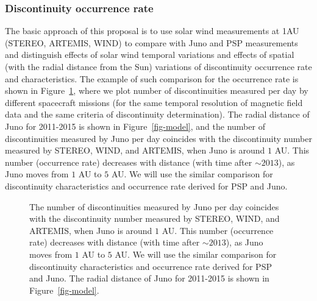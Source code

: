 \documentclass[
  letterpaper,
  DIV=11,
  numbers=noendperiod]{scrartcl}
\begin{document}
\subsubsection{Discontinuity occurrence
rate}\label{discontinuity-occurrence-rate}

The basic approach of this proposal is to use solar wind measurements at
1AU (STEREO, ARTEMIS, WIND) to compare with Juno and PSP measurements
and distinguish effects of solar wind temporal variations and effects of
spatial (with the radial distance from the Sun) variations of
discontinuity occurrence rate and characteristics. The example of such
comparison for the occurrence rate is shown in Figure~\ref{fig-rate},
where we plot number of discontinuities measured per day by different
spacecraft missions (for the same temporal resolution of magnetic field
data and the same criteria of discontinuity determination). The radial
distance of Juno for 2011-2015 is shown in Figure~\ref{fig-model}, and
the number of discontinuities measured by Juno per day coincides with
the discontinuity number measured by STEREO, WIND, and ARTEMIS, when
Juno is around \(1\) AU. This number (occurrence rate) decreases with
distance (with time after \(\sim 2013\)), as Juno moves from \(1\) AU to
\(5\) AU. We will use the similar comparison for discontinuity
characteristics and occurrence rate derived for PSP and Juno.

\begin{figure}


\caption{\label{fig-rate}The number of discontinuities measured by Juno
per day coincides with the discontinuity number measured by STEREO,
WIND, and ARTEMIS, when Juno is around \(1\) AU. This number (occurrence
rate) decreases with distance (with time after \(\sim 2013\)), as Juno
moves from \(1\) AU to \(5\) AU. We will use the similar comparison for
discontinuity characteristics and occurrence rate derived for PSP and
Juno. The radial distance of Juno for 2011-2015 is shown in
Figure~\ref{fig-model}.}

\end{figure}%
\end{document}
